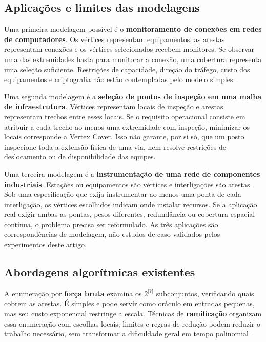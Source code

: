 \subsection{Aplicações e limites das modelagens}

Uma primeira modelagem possível é o \textbf{monitoramento de conexões em
redes de computadores}. Os vértices representam equipamentos, as arestas
representam conexões e os vértices selecionados recebem monitores.
Se observar uma das extremidades basta para monitorar a conexão,
uma cobertura representa uma seleção suficiente. Restrições de
capacidade, direção do tráfego, custo dos equipamentos e criptografia
não estão contempladas pelo modelo simples.

Uma segunda modelagem é a \textbf{seleção de pontos de inspeção em uma
malha de infraestrutura}. Vértices representam locais de inspeção e
arestas representam trechos entre esses locais. Se o requisito
operacional consiste em atribuir a cada trecho ao menos uma
extremidade com inspeção, minimizar os locais corresponde a Vertex
Cover. Isso não garante, por si só, que um posto inspecione toda a
extensão física de uma via, nem resolve restrições de deslocamento
ou de disponibilidade das equipes.

Uma terceira modelagem é a \textbf{instrumentação de uma rede de
componentes industriais}. Estações ou equipamentos são vértices e
interligações são arestas. Sob uma especificação que exija instrumentar
ao menos uma ponta de cada interligação, os vértices escolhidos indicam
onde instalar recursos. Se a aplicação real exigir ambas as pontas,
pesos diferentes, redundância ou cobertura espacial contínua, o problema
precisa ser reformulado. As três aplicações são correspondências de
modelagem, não estudos de caso validados pelos experimentos deste artigo.

\subsection{Abordagens algorítmicas existentes}

A enumeração por \textbf{força bruta} examina os $2^{|V|}$ subconjuntos,
verificando quais cobrem as arestas. É simples e pode servir como
oráculo em entradas pequenas, mas seu custo exponencial restringe
a escala. Técnicas de \textbf{ramificação} organizam essa enumeração
com escolhas locais; limites e regras de redução podem reduzir o
trabalho necessário, sem transformar a dificuldade geral em tempo
polinomial \cite{fomin2010}.

